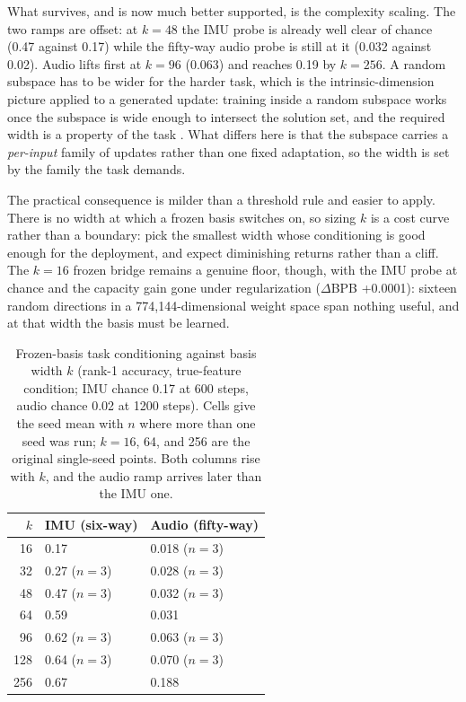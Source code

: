 \documentclass[11pt]{article}
\begin{document}
What survives, and is now much better supported, is the complexity scaling. The two ramps are offset: at $k{=}48$ the IMU probe is already well clear of chance (0.47 against 0.17) while the fifty-way audio probe is still at it (0.032 against 0.02). Audio lifts first at $k{=}96$ (0.063) and reaches 0.19 by $k{=}256$. A random subspace has to be wider for the harder task, which is the intrinsic-dimension picture applied to a generated update: training inside a random subspace works once the subspace is wide enough to intersect the solution set, and the required width is a property of the task \cite{li2018intrinsic,aghajanyan2021intrinsic}. What differs here is that the subspace carries a \emph{per-input} family of updates rather than one fixed adaptation, so the width is set by the family the task demands.

The practical consequence is milder than a threshold rule and easier to apply. There is no width at which a frozen basis switches on, so sizing $k$ is a cost curve rather than a boundary: pick the smallest width whose conditioning is good enough for the deployment, and expect diminishing returns rather than a cliff. The $k{=}16$ frozen bridge remains a genuine floor, though, with the IMU probe at chance and the capacity gain gone under regularization ($\Delta$BPB +0.0001): sixteen random directions in a 774,144-dimensional weight space span nothing useful, and at that width the basis must be learned.

\begin{table}[t]
\centering
\caption{Frozen-basis task conditioning against basis width $k$ (rank-1 accuracy, true-feature condition; IMU chance 0.17 at 600 steps, audio chance 0.02 at 1200 steps). Cells give the seed mean with $n$ where more than one seed was run; $k{=}16$, 64, and 256 are the original single-seed points. Both columns rise with $k$, and the audio ramp arrives later than the IMU one.}
\label{tab:span}
\begin{tabular}{rll}
\toprule
$k$ & IMU (six-way) & Audio (fifty-way) \\
\midrule
16 & 0.17 & 0.018 {\footnotesize ($n{=}3$)} \\
32 & 0.27 {\footnotesize ($n{=}3$)} & 0.028 {\footnotesize ($n{=}3$)} \\
48 & 0.47 {\footnotesize ($n{=}3$)} & 0.032 {\footnotesize ($n{=}3$)} \\
64 & 0.59 & 0.031 \\
96 & 0.62 {\footnotesize ($n{=}3$)} & 0.063 {\footnotesize ($n{=}3$)} \\
128 & 0.64 {\footnotesize ($n{=}3$)} & 0.070 {\footnotesize ($n{=}3$)} \\
256 & 0.67 & 0.188 \\
\bottomrule
\end{tabular}
\end{table}
\end{document}

